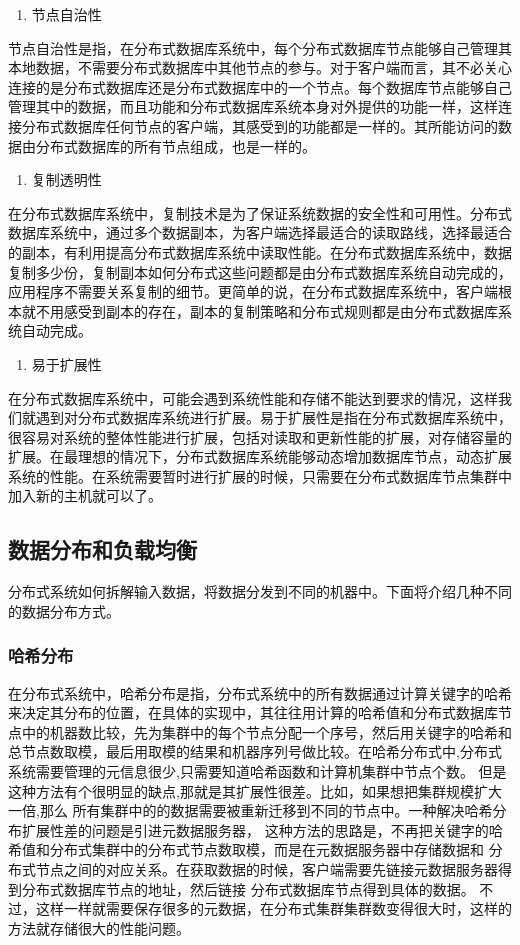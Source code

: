 	\begin{enumerate}[resume]
		\item 节点自治性
	\end{enumerate}

	节点自治性是指，在分布式数据库系统中，每个分布式数据库节点能够自己管理其本地数据，不需要分布式数据库中其他节点的参与。对于客户端而言，其不必关心连接的是分布式数据库还是分布式数据库中的一个节点。每个数据库节点能够自己管理其中的数据，而且功能和分布式数据库系统本身对外提供的功能一样，这样连接分布式数据库任何节点的客户端，其感受到的功能都是一样的。其所能访问的数据由分布式数据库的所有节点组成，也是一样的。

	\begin{enumerate}[resume]
		\item 复制透明性
	\end{enumerate}

	在分布式数据库系统中，复制技术是为了保证系统数据的安全性和可用性。分布式数据库系统中，通过多个数据副本，为客户端选择最适合的读取路线，选择最适合的副本，有利用提高分布式数据库系统中读取性能。在分布式数据库系统中，数据复制多少份，复制副本如何分布式这些问题都是由分布式数据库系统自动完成的，应用程序不需要关系复制的细节。更简单的说，在分布式数据库系统中，客户端根本就不用感受到副本的存在，副本的复制策略和分布式规则都是由分布式数据库系统自动完成。

	\begin{enumerate}[resume]
		\item 易于扩展性
	\end{enumerate}

	在分布式数据库系统中，可能会遇到系统性能和存储不能达到要求的情况，这样我们就遇到对分布式数据库系统进行扩展。易于扩展性是指在分布式数据库系统中，很容易对系统的整体性能进行扩展，包括对读取和更新性能的扩展，对存储容量的扩展。在最理想的情况下，分布式数据库系统能够动态增加数据库节点，动态扩展系统的性能。在系统需要暂时进行扩展的时候，只需要在分布式数据库节点集群中加入新的主机就可以了。
	\subsection{数据分布和负载均衡}
分布式系统如何拆解输入数据，将数据分发到不同的机器中。下面将介绍几种不同的数据分布方式。 
\subsubsection{哈希分布}
在分布式系统中，哈希分布是指，分布式系统中的所有数据通过计算关键字的哈希来决定其分布的位置，在具体的实现中，其往往用计算的哈希值和分布式数据库节点中的机器数比较，先为集群中的每个节点分配一个序号，然后用关键字的哈希和总节点数取模，最后用取模的结果和机器序列号做比较。在哈希分布式中,分布式系统需要管理的元信息很少,只需要知道哈希函数和计算机集群中节点个数。 
但是这种方法有个很明显的缺点,那就是其扩展性很差。比如，如果想把集群规模扩大一倍,那么
所有集群中的的数据需要被重新迁移到不同的节点中。一种解决哈希分布扩展性差的问题是引进元数据服务器， 
这种方法的思路是，不再把关键字的哈希值和分布式集群中的分布式节点数取模，而是在元数据服务器中存储数据和
分布式节点之间的对应关系。在获取数据的时候，客户端需要先链接元数据服务器得到分布式数据库节点的地址，然后链接
分布式数据库节点得到具体的数据。
不过，这样一样就需要保存很多的元数据，在分布式集群集群数变得很大时，这样的方法就存储很大的性能问题。
